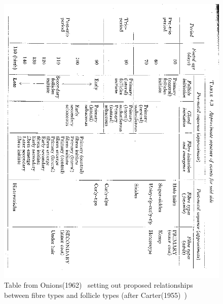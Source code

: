 %

\begin{figure}[!h]
  \centering
   \includegraphics[width=1.0\textwidth]{follicletypes2.png}
  \caption{Table from Onions(1962)~\cite{onio:62} setting out proposed relationships between fibre types and follicle types (after Carter(1955)~\cite{cart:55})}
  \label{fig:follicletypes}
\end{figure}

%

